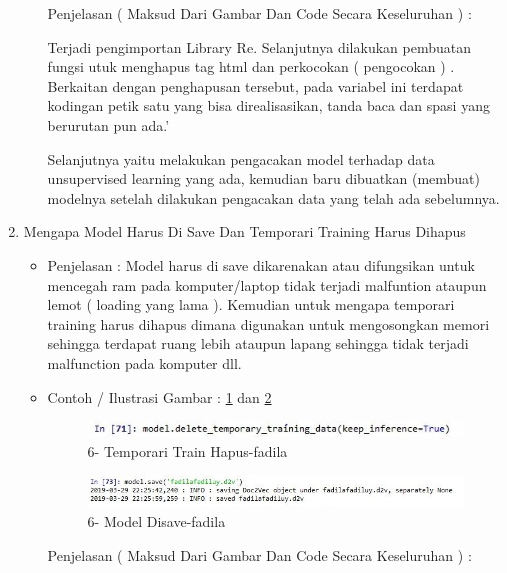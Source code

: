 \begin{enumerate}
\begin{itemize}
\par
\par Penjelasan ( Maksud Dari Gambar Dan Code Secara Keseluruhan ) : 
\par Terjadi pengimportan Library Re. Selanjutnya dilakukan pembuatan fungsi utuk menghapus tag html dan perkocokan ( pengocokan ) . Berkaitan dengan penghapusan tersebut, pada variabel ini terdapat kodingan petik satu yang bisa direalisasikan, tanda baca dan spasi yang berurutan pun ada.'
\par Selanjutnya yaitu melakukan pengacakan model terhadap data unsupervised learning yang ada, kemudian baru dibuatkan (membuat) modelnya setelah dilakukan pengacakan data yang telah ada sebelumnya.
\par
\end{itemize}
\item Mengapa Model Harus Di Save Dan Temporari Training Harus Dihapus
\begin{itemize}
\item Penjelasan : Model harus di save dikarenakan atau difungsikan untuk mencegah ram pada komputer/laptop tidak terjadi malfuntion ataupun lemot ( loading yang lama ). Kemudian untuk mengapa temporari training harus dihapus dimana digunakan untuk mengosongkan memori sehingga terdapat ruang lebih ataupun lapang sehingga tidak terjadi malfunction pada komputer dll.
\item Contoh / Ilustrasi Gambar : \ref{6-modelsavedelete-1-fadila} dan \ref{6-modelsavedelete-2-fadila}
\par
\begin{figure}[!hbtp]
\centering
\includegraphics[scale=0.3]{figures/6-modelsavedelete-1-fadila.jpg}
\caption{6-  Temporari Train Hapus-fadila}
\label{6-modelsavedelete-1-fadila}
\end{figure}
\par
\begin{figure}[!hbtp]
\centering
\includegraphics[scale=0.3]{figures/6-modelsavedelete-2-fadila.jpg}
\caption{6- Model Disave-fadila}
\label{6-modelsavedelete-2-fadila}
\end{figure}
\par
\par Penjelasan ( Maksud Dari Gambar Dan Code Secara Keseluruhan ) : 

\end{itemize}
\end{enumerate}
